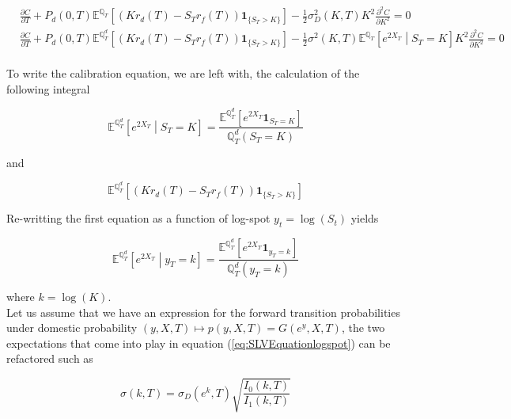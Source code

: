 \documentclass{article}
\begin{document}
\begin{equation}
\begin{aligned}
	&\frac{\partial C}{\partial T} + P_d(0,T) \mathbb{E}^{\mathbb{Q}_T} \left[ \left(K r_d(T) - S_T r_f(T)\right) \textbf{1}_{\{S_T > K\}}\right] - \frac{1}{2} \sigma_D^2(K,T) K^2 \frac{\partial^2 C}{\partial K^2} = 0\\
	&\frac{\partial C}{\partial T} + P_d(0,T) \mathbb{E}^{\mathbb{Q}_T^d} \left[ \left(K r_d(T) - S_T r_f(T)\right) \textbf{1}_{\{S_T > K\}}\right] - \frac{1}{2} \sigma^2(K,T) \mathbb{E}^{\mathbb{Q}_T}\left[e^{2X_T}\middle| S_T=K\right] K^2 \frac{\partial^2 C}{\partial K^2} = 0\\
\end{aligned}
\end{equation}

\noindent To write the calibration equation, we are left with, the calculation of the following integral

\begin{equation}
	\mathbb{E}^{\mathbb{Q}_T^d}\left[e^{2X_T}\middle| S_T=K\right] = \frac{\mathbb{E}^{\mathbb{Q}_T^d}\left[e^{2X_T} \textbf{1}_{S_T=K}\right]}{\mathbb{Q}_T^d(S_T = K)}
\end{equation}

\noindent and 

\begin{equation}
	\label{eq:SLVEquationstochRates}
	\mathbb{E}^{\mathbb{Q}_T^d} \left[ \left(K r_d(T) - S_T r_f(T)\right) \textbf{1}_{\{S_T > K\}}\right] 
\end{equation}

\noindent Re-writting the first equation as a function of log-spot $y_t = \log\left(S_t\right)$ yields

\begin{equation}
	\label{eq:SLVEquationlogspot}
	\mathbb{E}^{\mathbb{Q}_T^d}\left[e^{2X_T}\middle| y_T=k\right] = \frac{\mathbb{E}^{\mathbb{Q}_T^d}\left[e^{2X_T} \textbf{1}_{y_T=k}\right]}{\mathbb{Q}_T^d(y_T = k)}
\end{equation}

\noindent where $k = \log(K)$.\\

\noindent Let us assume that we have an expression for the forward transition probabilities under domestic probability $(y,X,T) \mapsto p(y,X,T) = G(e^y,X,T)$, the two expectations that come into play in equation (\ref{eq:SLVEquationlogspot}) can be refactored such as

\begin{equation}
	\label{eq:calibrationlocalvolSLV}
	\sigma(k,T) = \sigma_D(e^k, T) \sqrt{\frac{I_0(k,T)}{I_1(k,T)}}
\end{equation}
\end{document}
